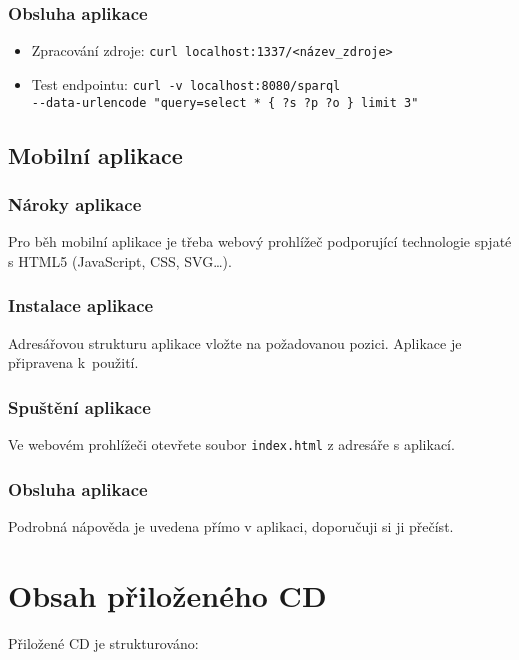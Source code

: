 \subsection{Obsluha aplikace}
\begin{itemize}
 \item Zpracování zdroje: \texttt{curl localhost:1337/<název\_zdroje>}
 \item Test  endpointu: \texttt{curl -v localhost:8080/sparql \\ -{}-data-urlencode "query=select * \{ ?s ?p ?o \} limit 3"}
\end{itemize}

\section{Mobilní aplikace}
\subsection{Nároky aplikace}
Pro běh mobilní aplikace je třeba webový prohlížeč podporující technologie spjaté s HTML5 (JavaScript, CSS, SVG\dots).

\subsection{Instalace aplikace}
Adresářovou strukturu aplikace vložte na požadovanou pozici. Aplikace je připravena k~použití.

\subsection{Spuštění aplikace}
Ve webovém prohlížeči otevřete soubor \texttt{index.html} z adresáře s aplikací.

\subsection{Obsluha aplikace}
Podrobná nápověda je uvedena přímo v aplikaci, doporučuji si ji přečíst.



\chapter{Obsah přiloženého CD}

Přiložené CD je strukturováno:

